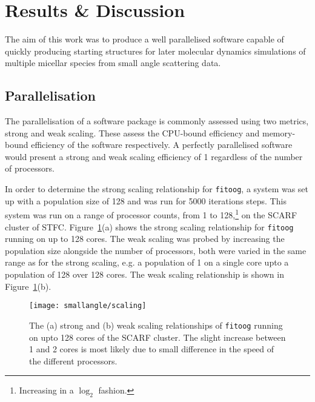 \section{Results \& Discussion}
The aim of this work was to produce a well parallelised software capable of quickly producing starting structures for later molecular dynamics simulations of multiple micellar species from small angle scattering data.

\subsection{Parallelisation}
The parallelisation of a software package is commonly assessed using two metrics, strong and weak scaling.
These assess the CPU-bound efficiency and memory-bound efficiency of the software respectively.
A perfectly parallelised software would present a strong and weak scaling efficiency of 1 regardless of the number of processors.

In order to determine the strong scaling relationship for \texttt{fitoog}, a system was set up with a population size of 128 and was run for 5000 iterations steps.
This system was run on a range of processor counts, from 1 to 128,\footnote{Increasing in a $\log_2$ fashion.} on the SCARF cluster of STFC.
Figure~\ref{fig:scale}(a) shows the strong scaling relationship for \texttt{fitoog} running on up to 128 cores.
The weak scaling was probed by increasing the population size alongside the number of processors, both were varied in the same range as for the strong scaling, e.g. a population of 1 on a single core upto a population of 128 over 128 cores.
The weak scaling relationship is shown in Figure~\ref{fig:scale}(b).
%
\begin{figure}
    \centering
    \texttt{[image: smallangle/scaling]}
    \caption{The (a) strong and (b) weak scaling relationships of \texttt{fitoog} running on upto 128 cores of the SCARF cluster. The slight increase between \num{1} and \num{2} cores is most likely due to small difference in the speed of the different processors.}
    \label{fig:scale}
\end{figure}
%

